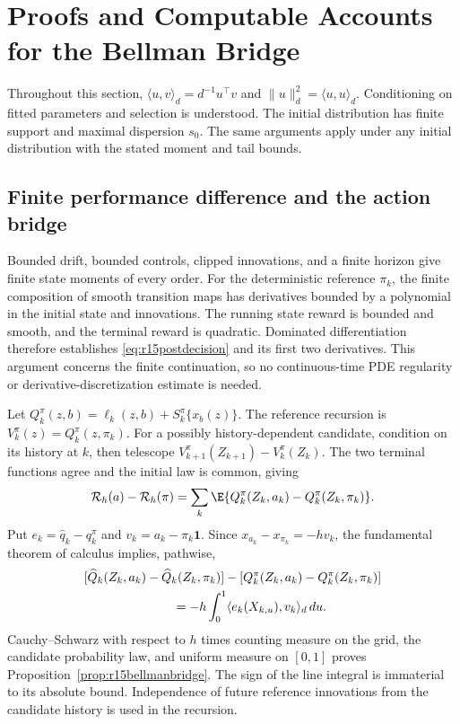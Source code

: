 \section{Proofs and Computable Accounts for the Bellman Bridge}
\label{app:r15bridge}
Throughout this section, $\langle u,v\rangle_d=d^{-1}u^\top v$ and
$\|u\|_d^2=\langle u,u\rangle_d$. Conditioning on fitted parameters
and selection is understood. The initial distribution has finite
support and maximal dispersion $s_0$. The same arguments apply under
any initial distribution with the stated moment and tail bounds.

\subsection{Finite performance difference and the action bridge}
Bounded drift, bounded controls, clipped innovations, and a finite
horizon give finite state moments of every order. For the deterministic
reference $\pi_k$, the finite composition of smooth transition maps has
derivatives bounded by a polynomial in the initial state and innovations.
The running state reward is bounded and smooth, and the terminal reward
is quadratic. Dominated differentiation therefore establishes
\eqref{eq:r15postdecision} and its first two derivatives. This argument
concerns the finite continuation, so no continuous-time PDE regularity
or derivative-discretization estimate is needed.

Let
$Q_k^\pi(z,b)=\ell_k(z,b)+S_k^\pi\{x_b(z)\}$.
The reference recursion is $V_k^\pi(z)=Q_k^\pi(z,\pi_k)$.
For a possibly history-dependent candidate, condition on its history
at $k$, then telescope $V_{k+1}^\pi(Z_{k+1})-V_k^\pi(Z_k)$.
The two terminal functions agree and the initial law is common, giving
\begin{equation}
 \mathcal R_h(a)-\mathcal R_h(\pi)
 =\sum_k\E\{Q_k^\pi(Z_k,a_k)-Q_k^\pi(Z_k,\pi_k)\}.
 \label{eq:r15telescoping}
\end{equation}
Put $e_k=\widehat q_k-q_k^\pi$ and
$v_k=a_k-\pi_k\bm1$. Since $x_{a_k}-x_{\pi_k}=-hv_k$, the
fundamental theorem of calculus implies, pathwise,
\begin{align*}
 &[\widehat Q_k(Z_k,a_k)-\widehat Q_k(Z_k,\pi_k)]
       -[Q_k^\pi(Z_k,a_k)-Q_k^\pi(Z_k,\pi_k)]\\
 &\hspace{25mm}=-h\int_0^1\langle e_k(X_{k,u}),v_k\rangle_d\,du.
\end{align*}
Cauchy--Schwarz with respect to $h$ times counting measure on the grid,
the candidate probability law, and uniform measure on $[0,1]$ proves
Proposition~\ref{prop:r15bellmanbridge}. The sign of the line integral
is immaterial to its absolute bound. Independence of future reference
innovations from the candidate history is used in the recursion.

